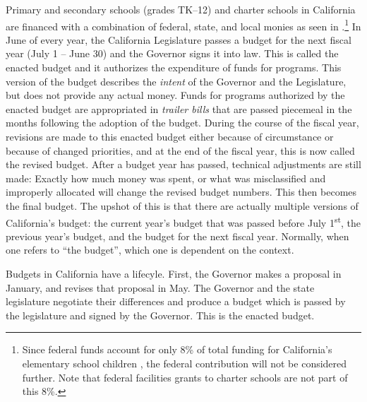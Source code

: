 Primary and secondary schools (grades TK–12) and charter schools in California are financed with a combination of federal, state, and local monies as seen in .\footnote{Since federal funds account for only 8\% of total funding for California's elementary school children \parencite{LAO2021}, the federal contribution will not be considered further. Note that federal facilities grants to charter schools are not part of this 8\%.} In June of every year, the California Legislature passes a budget for the next fiscal year (July 1 – June 30) and the Governor signs it into law. This is called the enacted budget and it authorizes the expenditure of funds for programs. This version of the budget describes the \textit{intent} of the Governor and the Legislature, but does not provide any actual money. Funds for programs authorized by the enacted budget are appropriated in \textit{trailer bills} that are passed piecemeal in the months following the adoption of the budget. During the course of the fiscal year, revisions are made to this enacted budget either because of circumstance or because of changed priorities, and at the end of the fiscal year, this is now called the revised budget. After a budget year has passed, technical adjustments are still made: Exactly how much money was spent, or what was misclassified and improperly allocated will change the revised budget numbers. This then becomes the final budget. The upshot of this is that there are actually multiple versions of California's budget: the current year's budget that was passed before July 1\textsuperscript{st}, the previous year's budget, and the budget for the next fiscal year. Normally, when one refers to ``the budget'', which one is dependent on the context.

Budgets in California have a lifecyle. First, the Governor makes a proposal in January, and revises that proposal in May. The Governor and the state legislature negotiate their differences and produce a budget which is passed by the legislature and signed by the Governor. This is the enacted budget.

